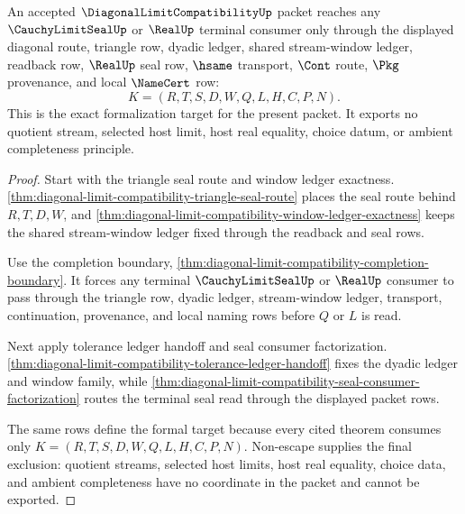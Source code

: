 \begin{theorem}
\label{thm:diagonal-limit-compatibility-terminal-formal-target}
An accepted $\DiagonalLimitCompatibilityUp$ packet reaches any $\CauchyLimitSealUp$ or $\RealUp$ terminal consumer only through the displayed diagonal route, triangle row, dyadic ledger, shared stream-window ledger, readback row, $\RealUp$ seal row, $\hsame$ transport, $\Cont$ route, $\Pkg$ provenance, and local $\NameCert$ row:
$$
K=(R,T,S,D,W,Q,L,H,C,P,N).
$$
This is the exact formalization target for the present packet. It exports no quotient stream, selected host limit, host real equality, choice datum, or ambient completeness principle.
\end{theorem}
\begin{proof}
Start with the triangle seal route and window ledger exactness. \autoref{thm:diagonal-limit-compatibility-triangle-seal-route} places the seal route behind $R,T,D,W$, and \autoref{thm:diagonal-limit-compatibility-window-ledger-exactness} keeps the shared stream-window ledger fixed through the readback and seal rows.

Use the completion boundary, \autoref{thm:diagonal-limit-compatibility-completion-boundary}. It forces any terminal $\CauchyLimitSealUp$ or $\RealUp$ consumer to pass through the triangle row, dyadic ledger, stream-window ledger, transport, continuation, provenance, and local naming rows before $Q$ or $L$ is read.

Next apply tolerance ledger handoff and seal consumer factorization. \autoref{thm:diagonal-limit-compatibility-tolerance-ledger-handoff} fixes the dyadic ledger and window family, while \autoref{thm:diagonal-limit-compatibility-seal-consumer-factorization} routes the terminal seal read through the displayed packet rows.

The same rows define the formal target because every cited theorem consumes only $K=(R,T,S,D,W,Q,L,H,C,P,N)$. Non-escape supplies the final exclusion: quotient streams, selected host limits, host real equality, choice data, and ambient completeness have no coordinate in the packet and cannot be exported.
\end{proof}

